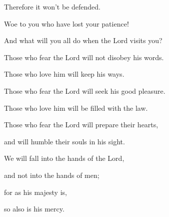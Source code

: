 {\par }{\QB Therefore it won’t be defended.
\par }{\Q {}Woe to you who have lost your patience!
\par }{\QB And what will you all do when the Lord visits you?
\par }{\Q {}Those who fear the Lord will not disobey his words.
\par }{\QB Those who love him will keep his ways.
\par }{\Q {}Those who fear the Lord will seek his good pleasure.
\par }{\QB Those who love him will be filled with the law.
\par }{\Q {}Those who fear the Lord will prepare their hearts,
\par }{\QB and will humble their souls in his sight.
\par }{\Q {}We will fall into the hands of the Lord,
\par }{\QB and not into the hands of men;
\par }{\Q for as his majesty is,
\par }{\QB so also is his mercy.
\par }{\BB \par }
